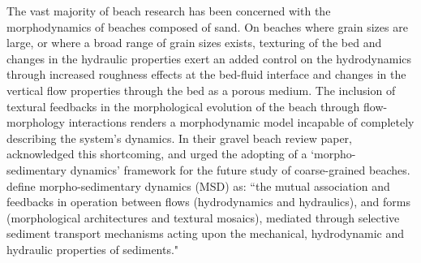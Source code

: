 
The vast majority of beach research has been concerned with the morphodynamics of beaches composed of sand. On beaches where grain sizes are large, or where a broad range of grain sizes exists, texturing of the bed and changes in the hydraulic properties exert an added control on the hydrodynamics through increased roughness effects at the bed-fluid interface and changes in the vertical flow properties through the bed as a porous medium. The inclusion of textural feedbacks in the morphological evolution of the beach through flow-morphology interactions renders a morphodynamic model incapable of completely describing the system's dynamics. In their gravel beach review paper, \citet{Buscombe_Masselink2006} acknowledged this shortcoming, and urged the adopting of a `morpho-sedimentary dynamics' framework for the future study of coarse-grained beaches. \citeauthor{Buscombe_Masselink2006} \citep[see also][]{Carter_Orford1993} define morpho-sedimentary dynamics (MSD) as: ``the mutual association and feedbacks in operation between flows (hydrodynamics and hydraulics), and forms (morphological architectures and textural mosaics), mediated through selective sediment transport mechanisms acting upon the mechanical, hydrodynamic and hydraulic properties of sediments."

%


